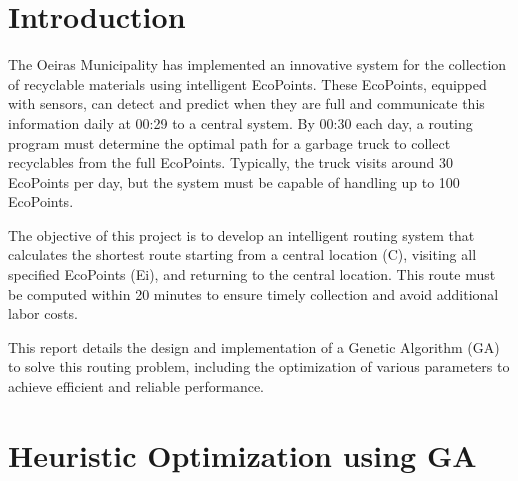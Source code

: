 \documentclass[10pt]{article}
\begin{document}
\maketitle


\section{Introduction}
\normalfont
The Oeiras Municipality has implemented an innovative system for the collection of recyclable materials using intelligent EcoPoints. These EcoPoints, equipped with sensors, can detect and predict when they are full and communicate this information daily at 00:29 to a central system. By 00:30 each day, a routing program must determine the optimal path for a garbage truck to collect recyclables from the full EcoPoints. Typically, the truck visits around 30 EcoPoints per day, but the system must be capable of handling up to 100 EcoPoints.

The objective of this project is to develop an intelligent routing system that calculates the shortest route starting from a central location (C), visiting all specified EcoPoints (Ei), and returning to the central location. This route must be computed within 20 minutes to ensure timely collection and avoid additional labor costs.

This report details the design and implementation of a Genetic Algorithm (GA) to solve this routing problem, including the optimization of various parameters to achieve efficient and reliable performance.


\section{Heuristic Optimization using GA}
\label{sec:heuristic_optimization}

\end{document}
